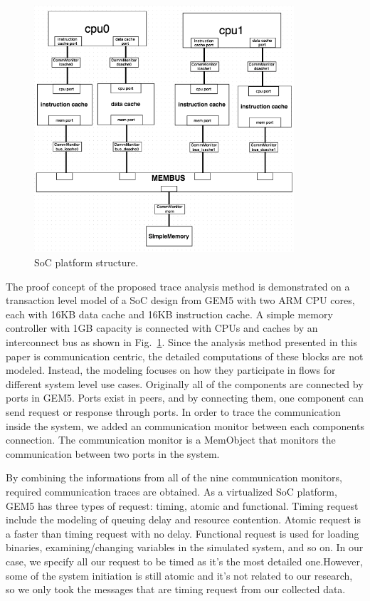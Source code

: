 \documentclass[conference]{IEEEtran}
\begin{document}
\begin{figure} 
\centerline{
\includegraphics[width=3.8in]{figures/Fig4.png}}
\caption{SoC platform structure.}
\label{SoC}
\end{figure}

The proof concept of the proposed trace analysis method is demonstrated on a transaction level model of a SoC design from GEM5 with two ARM CPU cores, each with 16KB data cache and 16KB instruction cache. A simple memory controller with 1GB capacity is connected with CPUs and caches by an interconnect bus as shown in Fig.~\ref{SoC}.  Since the analysis method presented in this paper is communication centric, the detailed computations of these blocks are not modeled. Instead, the modeling focuses on how they participate in flows for different system level use cases. Originally all of the components are connected by ports in GEM5. Ports exist in peers, and by connecting them, one component can send request or response through ports. In order to trace the communication inside the system, we added an communication monitor between each components connection. The communication monitor is a MemObject that monitors the communication  between two ports in the system.

By combining the informations from all of the nine communication monitors, required communication traces are obtained. As a virtualized SoC platform, GEM5 has three types of request: timing, atomic and functional. Timing request include the modeling of queuing delay and resource contention. Atomic request is a faster than timing request with no delay.  Functional request is used for loading binaries, examining/changing variables in the simulated system, and so on. In our case, we specify all our request to be timed as it's the most detailed one.However, some of the system initiation is still atomic and it's not related to our research, so we only took the messages that are timing request from our collected data. 
\end{document}
